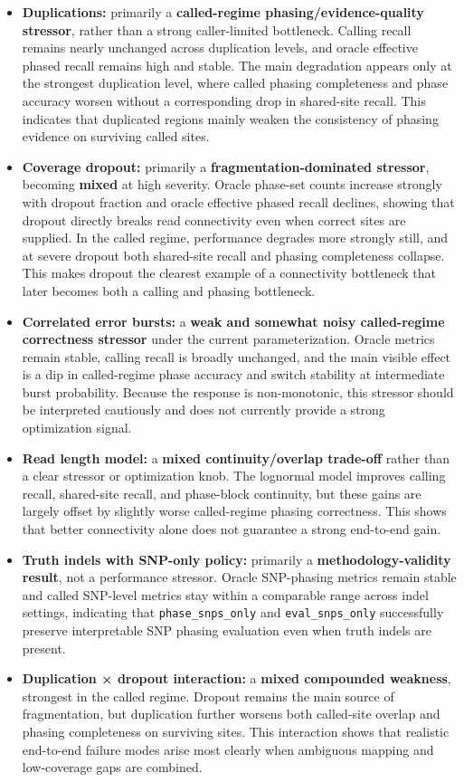 \documentclass[
]{article}
\begin{document}
\begin{itemize}
\item
  \textbf{Duplications:} primarily a \textbf{called-regime
  phasing/evidence-quality stressor}, rather than a strong
  caller-limited bottleneck. Calling recall remains nearly unchanged
  across duplication levels, and oracle effective phased recall remains
  high and stable. The main degradation appears only at the strongest
  duplication level, where called phasing completeness and phase
  accuracy worsen without a corresponding drop in shared-site recall.
  This indicates that duplicated regions mainly weaken the consistency
  of phasing evidence on surviving called sites.
\item
  \textbf{Coverage dropout:} primarily a \textbf{fragmentation-dominated
  stressor}, becoming \textbf{mixed} at high severity. Oracle phase-set
  counts increase strongly with dropout fraction and oracle effective
  phased recall declines, showing that dropout directly breaks read
  connectivity even when correct sites are supplied. In the called
  regime, performance degrades more strongly still, and at severe
  dropout both shared-site recall and phasing completeness collapse.
  This makes dropout the clearest example of a connectivity bottleneck
  that later becomes both a calling and phasing bottleneck.
\item
  \textbf{Correlated error bursts:} a \textbf{weak and somewhat noisy
  called-regime correctness stressor} under the current
  parameterization. Oracle metrics remain stable, calling recall is
  broadly unchanged, and the main visible effect is a dip in
  called-regime phase accuracy and switch stability at intermediate
  burst probability. Because the response is non-monotonic, this
  stressor should be interpreted cautiously and does not currently
  provide a strong optimization signal.
\item
  \textbf{Read length model:} a \textbf{mixed continuity/overlap
  trade-off} rather than a clear stressor or optimization knob. The
  lognormal model improves calling recall, shared-site recall, and
  phase-block continuity, but these gains are largely offset by slightly
  worse called-regime phasing correctness. This shows that better
  connectivity alone does not guarantee a strong end-to-end gain.
\item
  \textbf{Truth indels with SNP-only policy:} primarily a
  \textbf{methodology-validity result}, not a performance stressor.
  Oracle SNP-phasing metrics remain stable and called SNP-level metrics
  stay within a comparable range across indel settings, indicating that
  \texttt{phase\_snps\_only} and \texttt{eval\_snps\_only} successfully
  preserve interpretable SNP phasing evaluation even when truth indels
  are present.
\item
  \textbf{Duplication × dropout interaction:} a \textbf{mixed compounded
  weakness}, strongest in the called regime. Dropout remains the main
  source of fragmentation, but duplication further worsens both
  called-site overlap and phasing completeness on surviving sites. This
  interaction shows that realistic end-to-end failure modes arise most
  clearly when ambiguous mapping and low-coverage gaps are combined.
\end{itemize}
\end{document}
